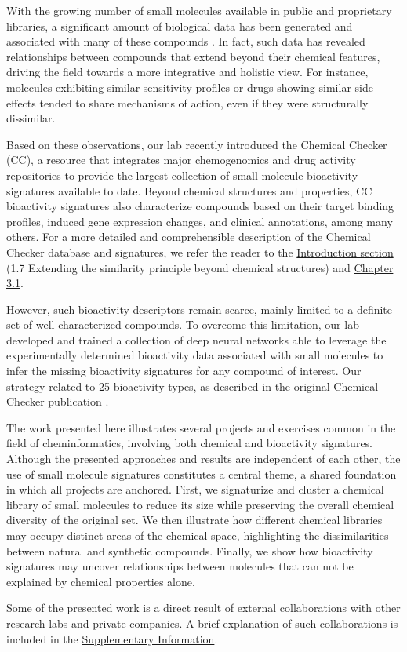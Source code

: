 With the growing number of small molecules available in public and proprietary libraries, a significant amount of biological data has been generated and associated with many of these compounds \cite{zdrazil_chembl_2024, kim_pubchem_2023}. In fact, such data has revealed relationships between compounds that extend beyond their chemical features, driving the field towards a more integrative and holistic view. For instance, molecules exhibiting similar sensitivity profiles or drugs showing similar side effects tended to share mechanisms of action, even if they were structurally dissimilar\cite{campillos_drug_2008}.

Based on these observations, our lab recently introduced the Chemical Checker (CC), a resource that integrates major chemogenomics and drug activity repositories to provide the largest collection of small molecule bioactivity signatures available to date. Beyond chemical structures and properties, CC bioactivity signatures also characterize compounds based on their target binding profiles, induced gene expression changes, and clinical annotations, among many others. For a more detailed and comprehensible description of the Chemical Checker database and signatures, we refer the reader to the \hyperref[Introduction_extending]{Introduction section} (1.7 Extending the similarity principle beyond chemical structures) and \hyperref[Chapter_3.1]{Chapter 3.1}. 

However, such bioactivity descriptors remain scarce, mainly limited to a definite set of well-characterized compounds. To overcome this limitation, our lab developed and trained a collection of deep neural networks able to leverage the experimentally determined bioactivity data associated with small molecules to infer the missing bioactivity signatures for any compound of interest\cite{bertoni_bioactivity_2021}. Our strategy related to 25 bioactivity types, as described in the original Chemical Checker publication \cite{duran-frigola_extending_2020}.

The work presented here illustrates several projects and exercises common in the field of cheminformatics, involving both chemical and bioactivity signatures. Although the presented approaches and results are independent of each other, the use of small molecule signatures constitutes a central theme, a shared foundation in which all projects are anchored. First, we signaturize and cluster a chemical library of small molecules to reduce its size while preserving the overall chemical diversity of the original set. We then illustrate how different chemical libraries may occupy distinct areas of the chemical space, highlighting the dissimilarities between natural and synthetic compounds. Finally, we show how bioactivity signatures may uncover relationships between molecules that can not be explained by chemical properties alone. 

Some of the presented work is a direct result of external collaborations with other research labs and private companies. A brief explanation of such collaborations is included in the \hyperref[Navigation_SupplementaryInformation]{Supplementary Information}. 




